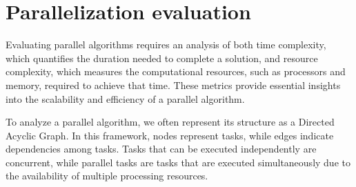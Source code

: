 \section{Parallelization evaluation}

Evaluating parallel algorithms requires an analysis of both time complexity, which quantifies the duration needed to complete a solution, and resource complexity, which measures the computational resources, such as processors and memory, required to achieve that time. 
These metrics provide essential insights into the scalability and efficiency of a parallel algorithm.

To analyze a parallel algorithm, we often represent its structure as a Directed Acyclic Graph. 
In this framework, nodes represent tasks, while edges indicate dependencies among tasks. 
Tasks that can be executed independently are concurrent, while parallel tasks are tasks that are executed simultaneously due to the availability of multiple processing resources.

